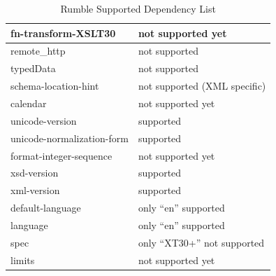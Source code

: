 \begin{table}
\begin{tabular}{|l|l|}
		\hline
		fn-transform-XSLT30                & not supported yet             \\ 
		\hline
		remote\_http                       & not supported                 \\ 
		\hline
		typedData                          & not supported                 \\ 
		\hline
		schema-location-hint               & not supported (XML specific)  \\ 
		\hline
		calendar                           & not supported yet             \\ 
		\hline
		unicode-version                    & supported                     \\ 
		\hline
		unicode-normalization-form         & supported                     \\ 
		\hline
		format-integer-sequence            & not supported yet             \\ 
		\hline
		xsd-version                        & supported                     \\ 
		\hline
		xml-version                        & supported                     \\ 
		\hline
		default-language                   & only ``en'' supported            \\ 
		\hline
		language                           & only ``en'' supported            \\ 
		\hline
		spec                               & only ``XT30+'' not supported    \\ 
		\hline
		limits                             & not supported yet             \\
		\hline
	\end{tabular}
	\caption{Rumble Supported Dependency List}
	\label{tab:Phase2_DependencyList}
\end{table}